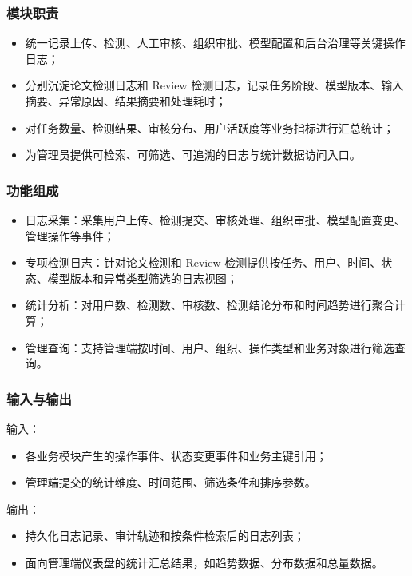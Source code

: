 \subsubsection{模块职责}
\begin{itemize}[leftmargin=2em]
    \item 统一记录上传、检测、人工审核、组织审批、模型配置和后台治理等关键操作日志；
    \item 分别沉淀论文检测日志和 Review 检测日志，记录任务阶段、模型版本、输入摘要、异常原因、结果摘要和处理耗时；
    \item 对任务数量、检测结果、审核分布、用户活跃度等业务指标进行汇总统计；
    \item 为管理员提供可检索、可筛选、可追溯的日志与统计数据访问入口。
\end{itemize}

\subsubsection{功能组成}
\begin{itemize}[leftmargin=2em]
    \item 日志采集：采集用户上传、检测提交、审核处理、组织审批、模型配置变更、管理操作等事件；
    \item 专项检测日志：针对论文检测和 Review 检测提供按任务、用户、时间、状态、模型版本和异常类型筛选的日志视图；
    \item 统计分析：对用户数、检测数、审核数、检测结论分布和时间趋势进行聚合计算；
    \item 管理查询：支持管理端按时间、用户、组织、操作类型和业务对象进行筛选查询。
\end{itemize}

\subsubsection{输入与输出}
输入：
\begin{itemize}[leftmargin=2em]
    \item 各业务模块产生的操作事件、状态变更事件和业务主键引用；
    \item 管理端提交的统计维度、时间范围、筛选条件和排序参数。
\end{itemize}

输出：
\begin{itemize}[leftmargin=2em]
    \item 持久化日志记录、审计轨迹和按条件检索后的日志列表；
    \item 面向管理端仪表盘的统计汇总结果，如趋势数据、分布数据和总量数据。
\end{itemize}

